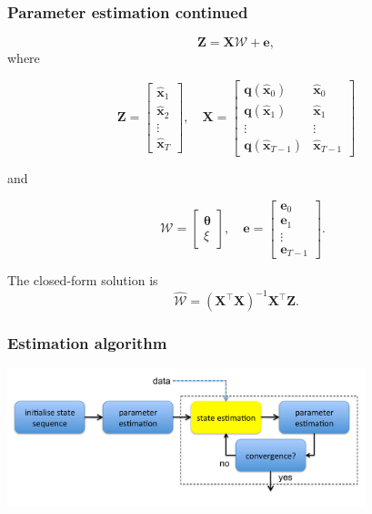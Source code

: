 \documentclass[compress]{beamer}
\begin{document}
\begin{frame}\frametitle{Parameter estimation continued}
\begin{equation}
	\mathbf Z=\mathbf X \mathcal W+\mathbf{e}, 
\end{equation}
\pause
where
\begin{small}
\begin{equation*}
	\mathbf Z=\left[
	\begin{array}{cccc}
		\hat{\mathbf x}_{1}\\
		\hat{\mathbf x}_{2}\\
		\vdots\\
		\hat{\mathbf x}_{T}
	\end{array}
	\right],\quad \mathbf X=\left[
	\begin{array}{cccc}
		\mathbf q(\hat{\mathbf x}_0)& \hat{\mathbf x}_{0}\\
		\mathbf q(\hat{\mathbf x}_1)& \hat{\mathbf x}_{1}\\
		\vdots & \vdots\\
		\mathbf q(\hat{\mathbf x}_{T-1})& \hat{\mathbf x}_{T-1}
	\end{array}
	\right] 
\end{equation*}
\end{small}
and
\begin{small}
\begin{equation*}
\quad \mathcal W=\left[
	\begin{array}{cc}
		\boldsymbol{\theta} \\
		\xi
	\end{array}
	\right],\quad \mathbf{e}=\left[
	\begin{array}{cccc}
		\mathbf e_0\\
		\mathbf e_1\\
		\vdots\\
		\mathbf e_{T-1}
	\end{array}
	\right].
\end{equation*}
\end{small}
\pause
The closed-form solution is
\begin{equation}
	\hat{\mathcal{W}}=(\mathbf X^\top\mathbf X)^{-1}\mathbf X^\top\mathbf Z. 
\end{equation}
\end{frame}

\begin{frame}\frametitle{Estimation algorithm}
\begin{center}
	\includegraphics[height=4cm]{./Figures/EstimationAlgorithm9.pdf}
\end{center}
\end{frame}
\end{document}
